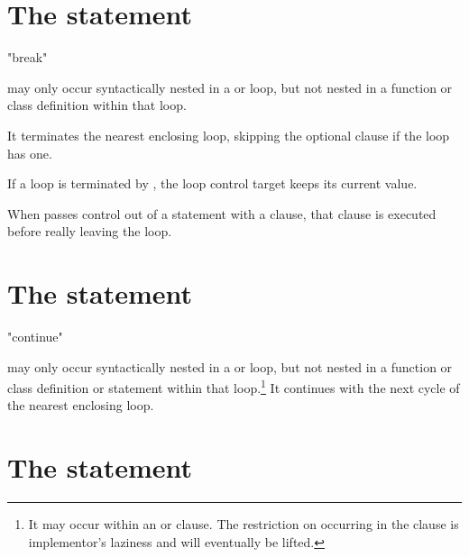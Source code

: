 \section{The  statement \label{break}}

\begin{productionlist}
             {"break"}
\end{productionlist}

 may only occur syntactically nested in a 
or  loop, but not nested in a function or class definition
within that loop.

It terminates the nearest enclosing loop, skipping the optional
 clause if the loop has one.

If a  loop is terminated by , the loop control
target keeps its current value.

When  passes control out of a  statement
with a  clause, that  clause is executed
before really leaving the loop.


\section{The  statement \label{continue}}

\begin{productionlist}
             {"continue"}
\end{productionlist}

 may only occur syntactically nested in a  or
 loop, but not nested in a function or class definition or
 statement within that loop.\footnote{It may
occur within an  or  clause.  The
restriction on occurring in the  clause is implementor's
laziness and will eventually be lifted.}
It continues with the next cycle of the nearest enclosing loop.


\section{The  statement \label{import}}

